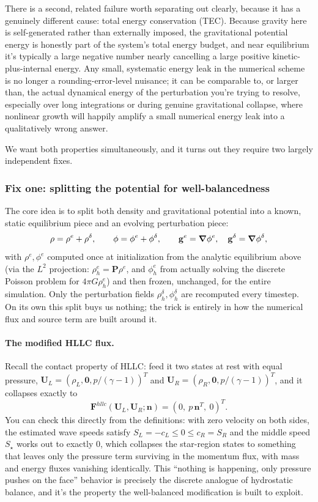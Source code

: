 There is a second, related failure worth separating out clearly, because it has a genuinely different cause: total energy conservation (TEC). Because gravity here is self-generated rather than externally imposed, the gravitational potential energy is honestly part of the system's total energy budget, and near equilibrium it's typically a large negative number nearly cancelling a large positive kinetic-plus-internal energy. Any small, systematic energy leak in the numerical scheme is no longer a rounding-error-level nuisance; it can be comparable to, or larger than, the actual dynamical energy of the perturbation you're trying to resolve, especially over long integrations or during genuine gravitational collapse, where nonlinear growth will happily amplify a small numerical energy leak into a qualitatively wrong answer.

We want both properties simultaneously, and it turns out they require two largely independent fixes.

\subsubsection{Fix one: splitting the potential for well-balancedness}

The core idea is to split both density and gravitational potential into a known, static equilibrium piece and an evolving perturbation piece:
\[
	\rho = \rho^e + \rho^\delta, \qquad \phi = \phi^e + \phi^\delta, \qquad \mathbf{g}^e = \grad\phi^e,\quad \mathbf{g}^\delta = \grad\phi^\delta,
\]
with $\rho^e, \phi^e$ computed once at initialization from the analytic equilibrium above (via the $L^2$ projection: $\rho_h^e = \mathbf{P}\rho^e$, and $\phi_h^e$ from actually solving the discrete Poisson problem for $4\pi G\rho_h^e$) and then frozen, unchanged, for the entire simulation. Only the perturbation fields $\rho_h^\delta,\phi_h^\delta$ are recomputed every timestep. On its own this split buys us nothing; the trick is entirely in how the numerical flux and source term are built around it.

\paragraph{The modified HLLC flux.} Recall the contact property of HLLC: feed it two states at rest with equal pressure, $\mathbf{U}_L = (\rho_L, \mathbf{0}, p/(\gamma-1))^T$ and $\mathbf{U}_R = (\rho_R, \mathbf{0}, p/(\gamma-1))^T$, and it collapses exactly to
\[
	\mathbf{F}^{hllc}(\mathbf{U}_L,\mathbf{U}_R;\mathbf{n}) = (0,\ p\,\mathbf{n}^T,\ 0)^T.
\]
You can check this directly from the definitions: with zero velocity on both sides, the estimated wave speeds satisfy $S_L = -c_L \le 0 \le c_R = S_R$ and the middle speed $S_\star$ works out to exactly $0$, which collapses the star-region states to something that leaves only the pressure term surviving in the momentum flux, with mass and energy fluxes vanishing identically. This ``nothing is happening, only pressure pushes on the face'' behavior is precisely the discrete analogue of hydrostatic balance, and it's the property the well-balanced modification is built to exploit.

